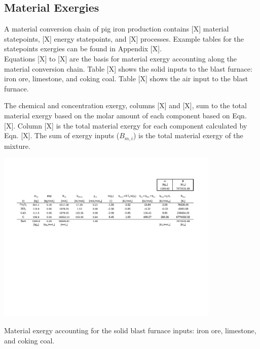 \documentclass[energies,article,submit,pdftex,moreauthors]{Definitions/mdpi}
\begin{document}
\subsection{Material Exergies}
\label{ssec: blast furnace example}

A material conversion chain
of pig iron production
contains [X] material statepoints,
[X] energy statepoints,
and [X] processes.
Example tables for the statepoints exergies
can be found in Appendix [X].\\

Equations [X] to [X] are the basis for material exergy accounting
along the material conversion chain.
Table [X] shows the solid inputs
to the blast furnace: iron ore, limestone, and coking coal.
Table [X] shows the air input
to the blast furnace.


The chemical and concentration exergy,
columns [X] and [X],
sum to the total material exergy
based on the molar amount
of each component
based on Eqn. [X].
Column [X] is the total material exergy
for each component
calculated by Eqn. [X].
The sum of exergy inputs ($B_{m,i}$)
is the total material exergy
of the mixture.


\begin{table}
  \centering
  \includegraphics[width=0.8\textwidth]{images/Solid BF Inputs.pdf}
  \caption{Material exergy accounting for the solid blast furnace inputs: iron ore, limestone, and coking coal.}
  \label{fig:Solid Blast Furnace Inputs}
\end{table}
\end{document}
